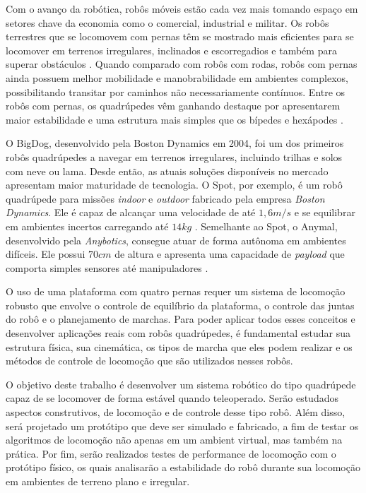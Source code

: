 \documentclass[../main.tex]{subfiles}
\begin{document}
Com o avanço da robótica, robôs móveis estão cada vez mais tomando espaço em setores chave da economia como o comercial, industrial e militar. Os robôs terrestres que se locomovem com pernas têm se mostrado mais eficientes para se locomover em terrenos irregulares, inclinados e escorregadios e também para superar obstáculos \cite{X.134}. Quando comparado com robôs com rodas, robôs com pernas ainda possuem melhor mobilidade e manobrabilidade em ambientes complexos, possibilitando transitar por caminhos não necessariamente contínuos. Entre os robôs com pernas, os quadrúpedes vêm ganhando destaque por apresentarem maior estabilidade e uma estrutura mais simples que os bípedes e hexápodes \cite{Shi2021}.

O BigDog, desenvolvido pela Boston Dynamics em 2004, foi um dos primeiros robôs quadrúpedes a navegar em terrenos irregulares, incluindo trilhas e solos com neve ou lama. Desde então, as atuais soluções disponíveis no mercado apresentam maior maturidade de tecnologia. O Spot, por exemplo, é um robô quadrúpede para missões \textit{indoor} e \textit{outdoor} fabricado pela empresa \textit{Boston Dynamics}. Ele é capaz de alcançar uma velocidade de até $1,6 m/s$ e se equilibrar em ambientes incertos carregando até $14 kg$ \cite{Spot}.  Semelhante ao Spot, o Anymal, desenvolvido pela \textit{Anybotics}, consegue atuar de forma autônoma em ambientes difíceis. Ele possui $70 cm$ de altura e apresenta uma capacidade de \textit{payload} que comporta simples sensores até manipuladores \cite{Fankhauser2018}.

O uso de uma plataforma com quatro pernas requer um sistema de locomoção robusto que envolve o controle de equilíbrio da plataforma, o controle das juntas do robô e o planejamento de marchas. Para poder aplicar todos esses conceitos e desenvolver aplicações reais com robôs quadrúpedes, é fundamental estudar sua estrutura física, sua cinemática, os tipos de marcha que eles podem realizar e os métodos de controle de locomoção que são utilizados nesses robôs.

O objetivo deste trabalho é desenvolver um sistema robótico do tipo quadrúpede capaz de se locomover de forma estável quando teleoperado. Serão estudados aspectos construtivos, de locomoção e de controle desse tipo robô. Além disso, será projetado um protótipo que deve ser simulado e fabricado, a fim de testar os algoritmos de locomoção não apenas em um ambient virtual, mas também na prática. Por fim, serão realizados testes de performance de locomoção com o protótipo físico, os quais analisarão a estabilidade do robô durante sua locomoção em ambientes de terreno plano e irregular.
\end{document}
